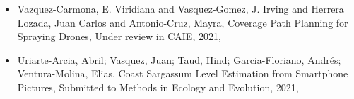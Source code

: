 \begin{itemize} 
\item Vazquez-Carmona, E. Viridiana and Vasquez-Gomez, J. Irving and Herrera Lozada, Juan Carlos and Antonio-Cruz, Mayra, Coverage Path Planning for Spraying Drones, Under review in CAIE, 2021, \href{https://arxiv.org/abs/2105.08743}{\faFilePdfO} 
\item Uriarte-Arcia, Abril; Vasquez, Juan; Taud, Hind; Garcia-Floriano, Andrés; Ventura-Molina, Elias, Coast Sargassum Level Estimation from Smartphone Pictures, Submitted to Methods in Ecology and Evolution, 2021, \href{https://arxiv.org/abs/3939932}{\faFilePdfO} 
\end{itemize} 

